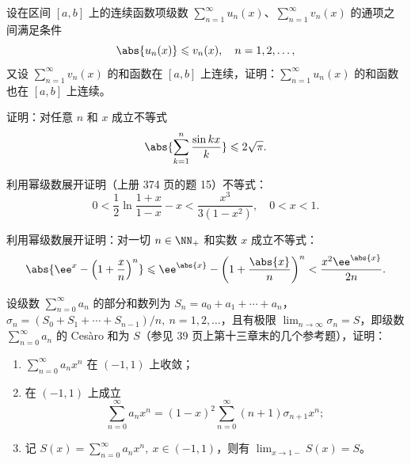 \begin{xreferenceproblem}[6]
设在区间 $[a,b]$ 上的连续函数项级数 $\displaystyle\sum_{n=1}^{\infty}u_n(x)$、$\displaystyle\sum_{n=1}^{\infty}v_n(x)$ 的通项之间满足条件
  \[
    \abs{u_n(x)}\leqslant v_n(x),\quad n=1,2,\ldots,
  \]
  又设 $\displaystyle\sum_{n=1}^{\infty}v_n(x)$ 的和函数在 $[a,b]$ 上连续，证明：$\displaystyle\sum_{n=1}^{\infty}u_n(x)$ 的和函数也在 $[a,b]$ 上连续。
\end{xreferenceproblem}

\begin{xreferenceproblem}[7]
证明：对任意 $n$ 和 $x$ 成立不等式
  \[
    \abs{\sum_{k=1}^{n}\frac{\sin kx}{k}}\leqslant2\sqrt\pi.
  \]
\end{xreferenceproblem}

\begin{xreferenceproblem}[8]
利用幂级数展开证明（上册 374 页的题 15）不等式：
  \[
    0<\frac12\ln\frac{1+x}{1-x}-x<\frac{x^3}{3(1-x^2)},\quad 0<x<1.
  \]
\end{xreferenceproblem}

\begin{xreferenceproblem}[9]
利用幂级数展开证明：对一切 $n\in\NN_+$ 和实数 $x$ 成立不等式：
  \[
    \abs{\ee^x-\left(1+\frac xn\right)^n}
    \leqslant \ee^{\abs{x}}-\left(1+\frac{\abs{x}}n\right)^n
    <\frac{x^2\ee^{\abs{x}}}{2n}.
  \]
\end{xreferenceproblem}

\begin{xreferenceproblem}[10]
设级数 $\displaystyle\sum_{n=0}^{\infty}a_n$ 的部分和数列为 $S_n=a_0+a_1+\cdots+a_n$，$\sigma_n=(S_0+S_1+\cdots+S_{n-1})/n,\ n=1,2,\ldots$，且有极限 $\displaystyle\lim_{n\to\infty}\sigma_n=S$，即级数 $\displaystyle\sum_{n=0}^{\infty}a_n$ 的 Cesàro 和为 $S$（参见 39 页上第十三章末的几个参考题），证明：
  \begin{enumerate}[label=(\arabic*)]
    \item $\displaystyle\sum_{n=0}^{\infty}a_nx^n$ 在 $(-1,1)$ 上收敛；
    \item 在 $(-1,1)$ 上成立
    \[
      \sum_{n=0}^{\infty}a_nx^n=(1-x)^2\sum_{n=0}^{\infty}(n+1)\sigma_{n+1}x^n;
    \]
    \item 记 $S(x)=\displaystyle\sum_{n=0}^{\infty}a_nx^n,\ x\in(-1,1)$，则有 $\displaystyle\lim_{x\to1-}S(x)=S$。
  \end{enumerate}
\end{xreferenceproblem}

